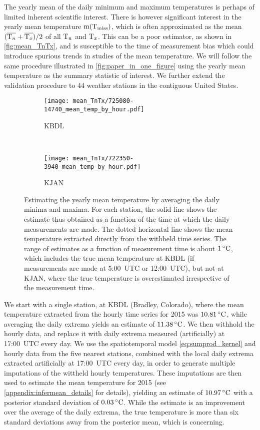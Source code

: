 The yearly mean of the daily minimum and maximum temperatures is perhaps of limited inherent scientific interest.
There is however significant interest in the yearly mean temperature $\operatorname{m}(\mathrm{T}_{\mathrm{miss}})$,
which is often approximated as the mean $(\overline{\mathrm{T}_{n}} + \overline{\mathrm{T}_{x}})/2$ of all $\mathrm{T}_{n}$ and $\mathrm{T}_{x}$.
This can be a poor estimator, as shown in \autoref{fig:mean_TnTx}, and is susceptible to the time of measurement bias
which could introduce spurious trends in studies of the mean temperature.
We will follow the same procedure illustrated in \autoref{fig:paper_in_one_figure}
using the yearly mean temperature as the summary statistic of interest.
We further extend the validation procedure to 44 weather stations in the contiguous United States.

\begin{figure}[t]
    \centering
    \begin{subfigure}[t]{0.37\textwidth}
    \texttt{[image: mean\_TnTx/725080-14740\_mean\_temp\_by\_hour.pdf]}
    \caption{
        \label{fig:mean_TnTx/KBDL} KBDL
    }
    \end{subfigure}
    ~
    \begin{subfigure}[t]{0.37\textwidth}
    \texttt{[image: mean\_TnTx/722350-3940\_mean\_temp\_by\_hour.pdf]}
    \caption{
        \label{fig:mean_TnTx/KJAN} KJAN
    }
    \end{subfigure}
    \caption{
        \label{fig:mean_TnTx}
        Estimating the yearly mean temperature by averaging the daily minima and maxima.
        For each station, the solid line shows the estimate thus obtained as a function of the time at which the daily
        measurements are made.
        The dotted horizontal line shows the mean temperature extracted directly from the withheld
        time series.
        The range of estimates as a function of measurement time is about $1{\,^\circ}{}\mathrm{C}$,
        which includes the true mean temperature at KBDL (if measurements are made at 5:00~UTC
        or 12:00~UTC), but not at KJAN, where the true temperature is overestimated irrespective of the
        measurement time.
    }
\end{figure}

We start with a single station, at KBDL (Bradley, Colorado), where the mean temperature
extracted from the hourly time series for 2015 was $10.81{\,^\circ}{}\mathrm{C}$, 
while averaging the daily extrema yields an estimate of $11.38{\,^\circ}{}\mathrm{C}$.
We then withhold the hourly data, and replace it with daily extrema measured (artificially)
at 17:00~UTC every day.
We use the spatiotemporal model \autoref{eq:sumprod_kernel}
and hourly data from the five nearest stations, combined with the local daily extrema extracted artificially
at 17:00~UTC every day, 
in order to generate multiple imputations of the wittheld hourly temperatures.
These imputations are then used to estimate the mean temperature for 2015
(see \autoref{appendix:infermean_details} for details),
yielding an estimate of $10.97{\,^\circ}{}\mathrm{C}$ with a posterior standard deviation of $0.03{\,^\circ}{}\mathrm{C}$.
While the estimate is an improvement over the average of the daily extrema, the true temperature
is more than six standard deviations away from the posterior mean,
which is concerning.


